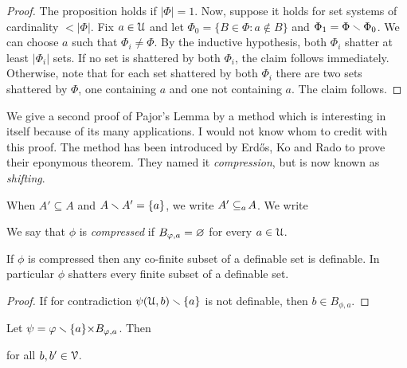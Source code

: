 \documentclass[sputnik.tex]{subfiles}
\begin{document}

\begin{proof}
The proposition holds if $|\Phi|=1$.
Now, suppose it holds for set systems of cardinality $<|\Phi|$.
Fix $a\in\EuScript U$ and let $\Phi_0=\big\{B\in\Phi : a\notin B\big\}$ and $\Phi_1=\Phi\smallsetminus\Phi_0$.
We can choose $a$ such that $\Phi_i\neq\Phi$.
By the inductive hypothesis, both $\Phi_i$ shatter at least $\big|\Phi_i\big|$ sets.
If no set is shattered by both $\Phi_i$, the claim follows immediately.
Otherwise, note that for each set shattered by both $\Phi_i$ there are two sets shattered by $\Phi$, one containing $a$ and one not containing $a$.
The claim follows.
\end{proof}
 
We give a second proof of Pajor's Lemma by a method which is interesting in itself because of its many applications.
I would not know whom to credit with this proof.
The method has been introduced by Erd\H{o}s, Ko and Rado to prove their eponymous theorem.
They named it \textit{compression}, but is now known as \textit{shifting}.


When $A'\subseteq A$ and $A\smallsetminus A'=\{a\}$, we write \emph{$A'\subseteq_{a}\kern-1.5pt A$}. We write


We say that $\phi$ is \emph{compressed\/} if $B_{\varphi,a}=\varnothing$ for every $a\in\EuScript U$.

\begin{proposition}\label{prop_compressed} 
If $\phi$ is compressed then any co-finite subset of a definable set is definable.
In particular $\phi$ shatters every finite subset of a definable set.
\end{proposition}

\begin{proof}
If for contradiction $\psi(\EuScript U,b)\smallsetminus\{a\}$ is not definable, then $b\in B_{\phi,a}$.
\end{proof}


\begin{proposition}\label{prop_conservative} Let $\psi=\varphi\smallsetminus\{a\}{\times}B_{\varphi,a}$.
Then

\hfill for all $b,b'\in\EuScript V$.
\end{proposition}
\end{document}
